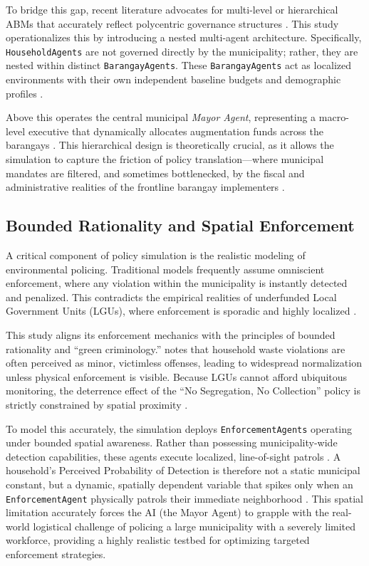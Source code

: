 To bridge this gap, recent literature advocates for multi-level or hierarchical ABMs that accurately reflect polycentric governance structures \citep{Brugiere2022}. This study operationalizes this by introducing a nested multi-agent architecture. Specifically, \texttt{HouseholdAgents} are not governed directly by the municipality; rather, they are nested within distinct \texttt{BarangayAgents}. These \texttt{BarangayAgents} act as localized environments with their own independent baseline budgets and demographic profiles \citep{TianCase2024}. 

Above this operates the central municipal \textit{Mayor Agent}, representing a macro-level executive that dynamically allocates augmentation funds across the barangays \citep{ZhengAI2022}. This hierarchical design is theoretically crucial, as it allows the simulation to capture the friction of policy translation—where municipal mandates are filtered, and sometimes bottlenecked, by the fiscal and administrative realities of the frontline barangay implementers \citep{Yazawa2025}.

\subsection{Bounded Rationality and Spatial Enforcement}

A critical component of policy simulation is the realistic modeling of environmental policing. Traditional models frequently assume omniscient enforcement, where any violation within the municipality is instantly detected and penalized. This contradicts the empirical realities of underfunded Local Government Units (LGUs), where enforcement is sporadic and highly localized \citep{Dalugdog2021}.

This study aligns its enforcement mechanics with the principles of bounded rationality and ``green criminology.'' \citet{Carpio2025} notes that household waste violations are often perceived as minor, victimless offenses, leading to widespread normalization unless physical enforcement is visible. Because LGUs cannot afford ubiquitous monitoring, the deterrence effect of the ``No Segregation, No Collection'' policy is strictly constrained by spatial proximity \citep{Badua2022}. 

To model this accurately, the simulation deploys \texttt{EnforcementAgents} operating under bounded spatial awareness. Rather than possessing municipality-wide detection capabilities, these agents execute localized, line-of-sight patrols \citep{Meng2018}. A household's Perceived Probability of Detection is therefore not a static municipal constant, but a dynamic, spatially dependent variable that spikes only when an \texttt{EnforcementAgent} physically patrols their immediate neighborhood \citep{Jimenez2025}. This spatial limitation accurately forces the AI (the Mayor Agent) to grapple with the real-world logistical challenge of policing a large municipality with a severely limited workforce, providing a highly realistic testbed for optimizing targeted enforcement strategies.